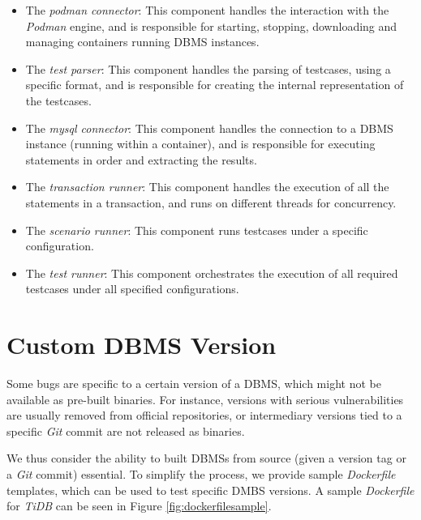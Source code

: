 \begin{itemize}
    \item The \textit{podman connector}: This component handles the interaction with the \textit{Podman} engine, and is responsible for starting, stopping, downloading and managing containers running DBMS instances.
    \item The \textit{test parser}: This component handles the parsing of testcases, using a specific format, and is responsible for creating the internal representation of the testcases.
    \item The \textit{mysql connector}: This component handles the connection to a DBMS instance (running within a container), and is responsible for executing statements in order and extracting the results.
    \item The \textit{transaction runner}: This component handles the execution of all the statements in a transaction, and runs on different threads for concurrency.
    \item The \textit{scenario runner}: This component runs testcases under a specific configuration.
    \item The \textit{test runner}: This component orchestrates the execution of all required testcases under all specified configurations. 
\end{itemize}

\section{Custom DBMS Version}

Some bugs are specific to a certain version of a DBMS, which might not be available as pre-built binaries. For instance, versions with serious vulnerabilities are usually removed from official repositories, or intermediary versions tied to a specific \textit{Git} commit are not released as binaries.

We thus consider the ability to built DBMSs from source (given a version tag or a \textit{Git} commit) essential. To simplify the process, we provide sample \textit{Dockerfile} templates, which can be used to test specific DMBS versions. A sample \textit{Dockerfile} for \textit{TiDB} can be seen in Figure \ref{fig:dockerfilesample}.
 

